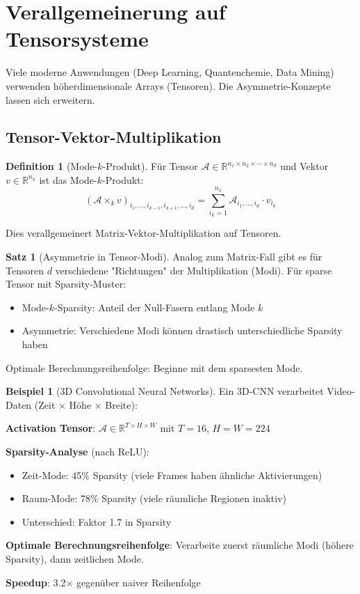 ﻿\documentclass[a4paper,12pt]{report}
\theoremstyle{definition}
\newtheorem{definition}{Definition}
\newtheorem{beispiel}{Beispiel}
\newtheorem{satz}{Satz}
\begin{document}
	\section{Verallgemeinerung auf Tensorsysteme}
	
	Viele moderne Anwendungen (Deep Learning, Quantenchemie, Data Mining) verwenden höherdimensionale Arrays (Tensoren). Die Asymmetrie-Konzepte lassen sich erweitern.
	
	\subsection{Tensor-Vektor-Multiplikation}
	
	\begin{definition}[Mode-$k$-Produkt]
		Für Tensor $\mathcal{A} \in \mathbb{R}^{n_1 \times n_2 \times \cdots \times n_d}$ und Vektor $v \in \mathbb{R}^{n_k}$ ist das Mode-$k$-Produkt:
		\[
		(\mathcal{A} \times_k v)_{i_1, \ldots, i_{k-1}, i_{k+1}, \ldots, i_d} = \sum_{i_k=1}^{n_k} \mathcal{A}_{i_1, \ldots, i_d} \cdot v_{i_k}
		\]
		
		Dies verallgemeinert Matrix-Vektor-Multiplikation auf Tensoren.
	\end{definition}
	
	\begin{satz}[Asymmetrie in Tensor-Modi]
		Analog zum Matrix-Fall gibt es für Tensoren $d$ verschiedene "Richtungen" der Multiplikation (Modi). Für sparse Tensor mit Sparsity-Muster:
		\begin{itemize}
			\item Mode-$k$-Sparsity: Anteil der Null-Fasern entlang Mode $k$
			\item Asymmetrie: Verschiedene Modi können drastisch unterschiedliche Sparsity haben
		\end{itemize}
		
		Optimale Berechnungsreihenfolge: Beginne mit dem sparsesten Mode.
	\end{satz}
	
	\begin{beispiel}[3D Convolutional Neural Networks]
		Ein 3D-CNN verarbeitet Video-Daten (Zeit $\times$ Höhe $\times$ Breite):
		
		\textbf{Activation Tensor}: $\mathcal{A} \in \mathbb{R}^{T \times H \times W}$ mit $T=16$, $H=W=224$
		
		\textbf{Sparsity-Analyse} (nach ReLU):
		\begin{itemize}
			\item Zeit-Mode: 45\% Sparsity (viele Frames haben ähnliche Aktivierungen)
			\item Raum-Mode: 78\% Sparsity (viele räumliche Regionen inaktiv)
			\item Unterschied: Faktor 1.7 in Sparsity
		\end{itemize}
		
		\textbf{Optimale Berechnungsreihenfolge}:
		Verarbeite zuerst räumliche Modi (höhere Sparsity), dann zeitlichen Mode.
		
		\textbf{Speedup}: 3.2$\times$ gegenüber naiver Reihenfolge
	\end{beispiel}
	
\end{document}

